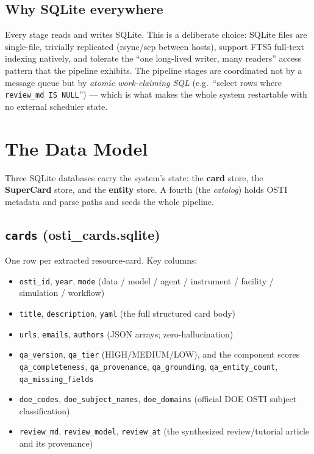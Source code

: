 \documentclass[11pt,letterpaper]{article}
\newcommand{\code}[1]{\texttt{\small #1}}
\begin{document}
\subsection{Why SQLite everywhere}

Every stage reads and writes SQLite. This is a deliberate choice: SQLite files are
single-file, trivially replicated (rsync/scp between hosts), support FTS5 full-text
indexing natively, and tolerate the ``one long-lived writer, many readers'' access
pattern that the pipeline exhibits. The pipeline stages are coordinated not by a
message queue but by \emph{atomic work-claiming SQL} (e.g.\ ``select rows where
\code{review\_md IS NULL}'') --- which is what makes the whole system restartable
with no external scheduler state.

\clearpage
\section{The Data Model}

Three SQLite databases carry the system's state: the \textbf{card} store, the
\textbf{SuperCard} store, and the \textbf{entity} store. A fourth (the \emph{catalog})
holds OSTI metadata and parse paths and seeds the whole pipeline.

\subsection{\code{cards} (osti\_cards.sqlite)}

One row per extracted resource-card. Key columns:

\begin{itemize}[noitemsep,topsep=2pt]
\item \code{osti\_id}, \code{year}, \code{mode}
  (data / model / agent / instrument / facility / simulation / workflow)
\item \code{title}, \code{description}, \code{yaml} (the full structured card body)
\item \code{urls}, \code{emails}, \code{authors} (JSON arrays; zero-hallucination)
\item \code{qa\_version}, \code{qa\_tier} (HIGH/MEDIUM/LOW), and the component scores
  \code{qa\_completeness}, \code{qa\_provenance}, \code{qa\_grounding},
  \code{qa\_entity\_count}, \code{qa\_missing\_fields}
\item \code{doe\_codes}, \code{doe\_subject\_names}, \code{doe\_domains}
  (official DOE OSTI subject classification)
\item \code{review\_md}, \code{review\_model}, \code{review\_at}
  (the synthesized review/tutorial article and its provenance)
\end{itemize}
\end{document}
